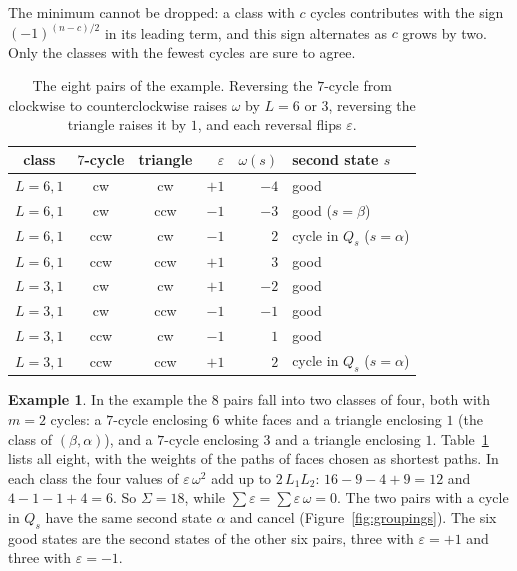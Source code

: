 \documentclass[10pt]{amsart}
\numberwithin{equation}{section}
\theoremstyle{definition}
\newtheorem{example}[equation]{Example}
\theoremstyle{remark}
\newcommand{\eps}{\varepsilon}
\begin{document}
The minimum cannot be dropped: a class with $c$ cycles contributes with the sign $(-1)^{(n-c)/2}$ in its leading term, and this sign alternates as $c$ grows by two.
Only the classes with the fewest cycles are sure to agree.

\begin{table}[H]
\centering
\begin{tabular}{@{}cccrrl@{}}
\toprule
class & $7$-cycle & triangle & $\eps$ & $\omega(s)$ & second state $s$ \\
\midrule
$L=6,1$ & cw & cw & $+1$ & $-4$ & good \\
$L=6,1$ & cw & ccw & $-1$ & $-3$ & good ($s=\beta$) \\
$L=6,1$ & ccw & cw & $-1$ & $2$ & cycle in $Q_s$ ($s=\alpha$) \\
$L=6,1$ & ccw & ccw & $+1$ & $3$ & good \\
\midrule
$L=3,1$ & cw & cw & $+1$ & $-2$ & good \\
$L=3,1$ & cw & ccw & $-1$ & $-1$ & good \\
$L=3,1$ & ccw & cw & $-1$ & $1$ & good \\
$L=3,1$ & ccw & ccw & $+1$ & $2$ & cycle in $Q_s$ ($s=\alpha$) \\
\bottomrule
\end{tabular}
\vspace{4pt}
\caption{The eight pairs of the example. Reversing the $7$-cycle from clockwise to counterclockwise raises $\omega$ by $L=6$ or $3$, reversing the triangle raises it by $1$, and each reversal flips $\eps$.}
\label{tab:pairs}
\end{table}

\begin{example}\label{ex:count}
In the example the $8$ pairs fall into two classes of four, both with $m=2$ cycles: a $7$-cycle enclosing $6$ white faces and a triangle enclosing $1$ (the class of $(\beta,\alpha)$), and a $7$-cycle enclosing $3$ and a triangle enclosing $1$.
Table~\ref{tab:pairs} lists all eight, with the weights of the paths of faces chosen as shortest paths.
In each class the four values of $\eps\,\omega^2$ add up to $2\,L_1L_2$: $16-9-4+9=12$ and $4-1-1+4=6$.
So $\Sigma=18$, while $\sum\eps=\sum\eps\,\omega=0$.
The two pairs with a cycle in $Q_s$ have the same second state $\alpha$ and cancel (Figure~\ref{fig:groupings}). The six good states are the second states of the other six pairs, three with $\eps=+1$ and three with $\eps=-1$.
\end{example}
\end{document}
